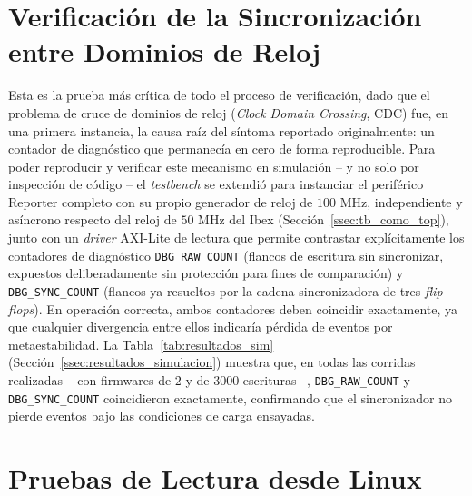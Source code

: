 
\section{Verificación de la Sincronización entre Dominios de Reloj}
\label{sec:verificacion_cdc}

Esta es la prueba más crítica de todo el proceso de verificación, dado que
el problema de cruce de dominios de reloj (\textit{Clock Domain Crossing},
CDC) fue, en una primera instancia, la causa raíz del síntoma reportado
originalmente: un contador de diagnóstico que permanecía en cero de forma
reproducible. Para poder reproducir y verificar este mecanismo en
simulación -- y no solo por inspección de código -- el \textit{testbench}
se extendió para instanciar el periférico Reporter completo con su propio
generador de reloj de $100\text{ MHz}$, independiente y asíncrono respecto
del reloj de $50\text{ MHz}$ del Ibex (Sección~\ref{ssec:tb_como_top}),
junto con un \textit{driver} AXI-Lite de lectura que permite contrastar
explícitamente los contadores de diagnóstico \texttt{DBG\_RAW\_COUNT}
(flancos de escritura sin sincronizar, expuestos deliberadamente sin
protección para fines de comparación) y \texttt{DBG\_SYNC\_COUNT} (flancos
ya resueltos por la cadena sincronizadora de tres \textit{flip-flops}). En
operación correcta, ambos contadores deben coincidir exactamente, ya que
cualquier divergencia entre ellos indicaría pérdida de eventos por
metaestabilidad. La Tabla~\ref{tab:resultados_sim}
(Sección~\ref{ssec:resultados_simulacion}) muestra que, en todas las
corridas realizadas -- con firmwares de $2$ y de $3000$ escrituras --,
\texttt{DBG\_RAW\_COUNT} y \texttt{DBG\_SYNC\_COUNT} coincidieron
exactamente, confirmando que el sincronizador no pierde eventos bajo las
condiciones de carga ensayadas.


\section{Pruebas de Lectura desde Linux}
\label{sec:pruebas_linux}

